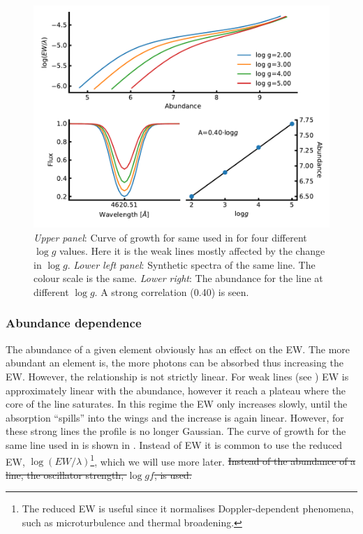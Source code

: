 \begin{figure}[htpb!]
    \centering
    \includegraphics[width=0.85\linewidth]{figures/ewGravity.pdf}
    \caption{\emph{Upper panel}: Curve of growth for same  used in  for
                                 four different $\log g$ values. Here it is the weak lines mostly
                                 affected by the change in $\log g$.
             \emph{Lower left panel}: Synthetic spectra of the same line. The colour scale is the
                                      same.
             \emph{Lower right}: The abundance for the line at different $\log g$. A strong
                                 correlation (0.40) is seen.}
    \label{fig:ewGravity}
\end{figure}




\subsubsection{Abundance dependence}

The abundance of a given element obviously has an effect on the EW. The more abundant an element is,
the more photons can be absorbed thus increasing the EW. However, the relationship is not strictly
linear. For weak lines (see ) EW is approximately linear with the abundance, however
it reach a plateau where the core of the line saturates. In this regime the EW only increases
slowly, until the absorption ``spills'' into the wings and the increase is again linear. However,
for these strong lines the profile is no longer Gaussian. The curve of growth for the same
 line used in  is shown in . Instead of EW it is common to
use the reduced EW, $\log (EW/\lambda)$\footnote{The reduced EW is useful since it normalises
Doppler-dependent phenomena, such as microturbulence and thermal broadening.}, which we will use
more later. \st{Instead of the abundance of a line, the oscillator strength, $\log \mathit{gf}$, is
used.}

